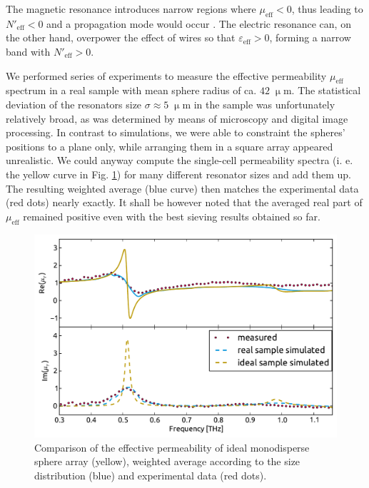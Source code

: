 {The magnetic resonance introduces narrow regions where $\mu_{\text{eff}} < 0$, thus leading to $N'_{\text{eff}} < 0$ and a propagation mode would occur \cite{dominec2013resonant}. The electric resonance can, on the other hand, overpower the effect of wires so that $\varepsilon_{\text{eff}} > 0$, forming a narrow band with $N'_{\text{eff}} > 0$.

We performed series of experiments to measure the effective permeability  $\mu_{\text{eff}}$ spectrum in a real sample with mean sphere radius of ca. $42\;\upmu$m. The statistical deviation of the resonators size $\sigma \approx 5\;\upmu$m in the sample was unfortunately relatively broad, as was determined by means of microscopy and digital image processing. In contrast to simulations, we were able to constraint the spheres' positions to a plane only, while arranging them in a square array appeared unrealistic. We could anyway compute the single-cell permeability spectra (i. e. the yellow curve in Fig. \ref{fg_experimentalConv}) for many different resonator sizes and add them up. The resulting weighted average (blue curve) then matches the experimental data (red dots) nearly exactly. It shall be however noted that the averaged real part of $\mu_{\text{eff}}$ remained positive even with the best sieving results obtained so far.
\begin{figure}[ht]  \caption{Comparison of the effective permeability of ideal monodisperse sphere array (yellow), weighted average according to the size distribution (blue) and experimental data (red dots).}
\label{fg_experimentalConv} \centering 
\includegraphics[width=12cm]{img/Spheres_FDTD_experimentalConv.pdf}
\end{figure}
}


